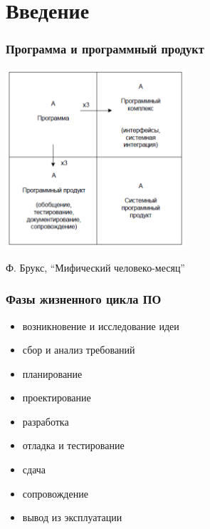 \documentclass{../../slides-style}
\begin{document}
    \begin{frame}[plain]
        \titlepage
    \end{frame}

    \section{Введение}
    
    \begin{frame}
        \frametitle{Программа и программный продукт}
        \begin{center}
            \includegraphics[width=0.5\textwidth]{mythical-man-month.png}
        \end{center}
        \begin{center}
            Ф. Брукс, ``Мифический человеко-месяц''
        \end{center}
    \end{frame}

    \begin{frame}
        \frametitle{Фазы жизненного цикла ПО}
        \begin{itemize}
            \item возникновение и исследование идеи
            \item сбор и анализ требований
            \item планирование 
            \item проектирование
            \item разработка
            \item отладка и тестирование
            \item сдача
            \item сопровождение
            \item вывод из эксплуатации
        \end{itemize}
    \end{frame}
\end{document}
